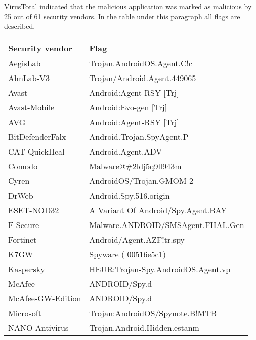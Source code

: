 VirusTotal indicated that the malicious application was marked as malicious by 25 out of 61 security vendors. In the table under this paragraph all flags are described.

\begin{tabular}{|l|l|}
    \hline
    \textbf{Security vendor} & \textbf{Flag}                        \\ \hline
    AegisLab                 & Trojan.AndroidOS.Agent.C!c           \\ \hline
    AhnLab-V3                & Trojan/Android.Agent.449065          \\ \hline
    Avast                    & Android:Agent-RSY {[}Trj{]}          \\ \hline
    Avast-Mobile             & Android:Evo-gen {[}Trj{]}            \\ \hline
    AVG                      & Android:Agent-RSY {[}Trj{]}          \\ \hline
    BitDefenderFalx          & Android.Trojan.SpyAgent.P            \\ \hline
    CAT-QuickHeal            & Android.Agent.ADV                    \\ \hline
    Comodo                   & Malware@\#2ldj5q9ll943m              \\ \hline
    Cyren                    & AndroidOS/Trojan.GMOM-2              \\ \hline
    DrWeb                    & Android.Spy.516.origin               \\ \hline
    ESET-NOD32               & A Variant Of Android/Spy.Agent.BAY   \\ \hline
    F-Secure                 & Malware.ANDROID/SMSAgent.FHAL.Gen    \\ \hline
    Fortinet                 & Android/Agent.AZF!tr.spy             \\ \hline
    K7GW                     & Spyware ( 00516e5c1)                 \\ \hline
    Kaspersky                & HEUR:Trojan-Spy.AndroidOS.Agent.vp   \\ \hline
    McAfee                   & ANDROID/Spy.d                        \\ \hline
    McAfee-GW-Edition        & ANDROID/Spy.d                        \\ \hline
    Microsoft                & Trojan:AndroidOS/Spynote.B!MTB       \\ \hline
    NANO-Antivirus           & Trojan.Android.Hidden.estanm         \\ \hline

\end{tabular}
